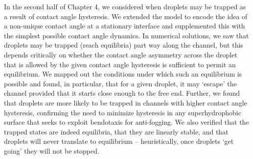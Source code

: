 In the second half of Chapter 4, we considered when droplets may be trapped as a result of contact angle hysteresis. We extended the model to encode the idea of a non-unique contact angle at a stationary interface and supplemented this with the simplest possible contact angle dynamics.  In numerical solutions, we saw that droplets may be trapped (reach equilibria) part way along the channel, but this depends critically on whether the contact angle asymmetry across the droplet that is allowed by the given contact angle hysteresis is sufficient to permit an equilibrium. We mapped out the conditions under which such an equilibrium is possible and found, in particular, that for a given droplet, it may `escape' the channel provided that it starts close enough to the free end. Further, we found that droplets are more likely to be trapped in channels with higher contact angle hysteresis, confirming the need to minimize hysteresis in any superhydrophobic surface that seeks to exploit bendotaxis for anti-fogging. We also verified that the trapped states are indeed equilibria, that they are linearly stable, and that droplets will never translate to equilibrium -- heuristically, once droplets `get going' they will not be stopped.

